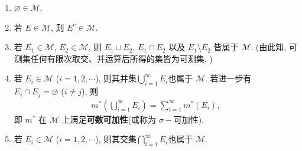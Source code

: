 \documentclass[../../main.tex]{subfiles}
\begin{document}
\begin{theorem}[可测集的性质]\label{theorem:可测集的性质}
\begin{enumerate}[(1)]
\item \(\varnothing \in \mathscr{M}\).
\item 若 \(E \in \mathscr{M}\), 则 \(E^c \in \mathscr{M}\).

\item 若 \(E_1 \in \mathscr{M}\), \(E_2 \in \mathscr{M}\), 则 \(E_1 \cup E_2\), \(E_1 \cap E_2\) 以及 \(E_1 \setminus E_2\) 皆属于 \(\mathscr{M}\). (由此知, 可测集任何有限次取交、并运算后所得的集皆为可测集. )
\item 若 \(E_i \in \mathscr{M}\) (\(i = 1,2,\cdots\)), 则其并集$\bigcup_{i = 1}^{\infty} E_i$也属于 \(\mathscr{M}\). 若进一步有 \(E_i \cap E_j = \varnothing\) (\(i \neq j\)), 则
\begin{align*}
m^*\left(\bigcup_{i = 1}^{\infty} E_i\right) = \sum_{i = 1}^{\infty} m^*(E_i),
\end{align*}
即 \(m^*\) 在 \(\mathscr{M}\) 上满足\textbf{可数可加性}(或称为 \(\sigma -\)可加性).

\item 若 \(E_i \in \mathscr{M}\) (\(i = 1,2,\cdots\)), 则其交集$\bigcap_{i = 1}^{\infty} E_i$也属于 \(\mathscr{M}\). 
\end{enumerate}
\end{theorem}
\end{document}
